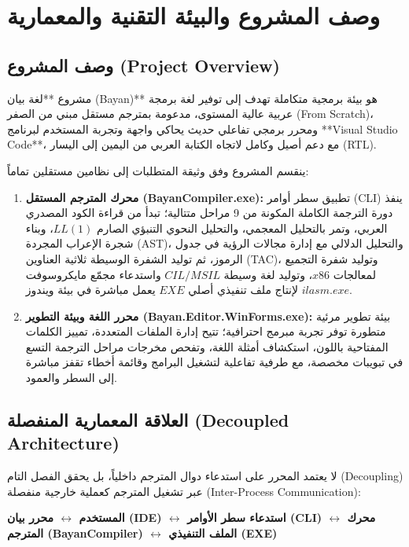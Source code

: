 \documentclass[12pt,a4paper]{report}
\begin{document}
\chapter{وصف المشروع والبيئة التقنية والمعمارية}

\section{وصف المشروع (Project Overview)}
مشروع **لغة بيان (Bayan)** هو بيئة برمجية متكاملة تهدف إلى توفير لغة برمجة عربية عالية المستوى، مدعومة بمترجم مستقل مبني من الصفر (From Scratch)، ومحرر برمجي تفاعلي حديث يحاكي واجهة وتجربة المستخدم لبرنامج **Visual Studio Code**، مع دعم أصيل وكامل لاتجاه الكتابة العربي من اليمين إلى اليسار (RTL).

ينقسم المشروع وفق وثيقة المتطلبات إلى نظامين مستقلين تماماً:
\begin{enumerate}
    \item \textbf{محرك المترجم المستقل (BayanCompiler.exe):} تطبيق سطر أوامر (CLI) ينفذ دورة الترجمة الكاملة المكونة من 9 مراحل متتالية؛ تبدأ من قراءة الكود المصدري العربي، وتمر بالتحليل المعجمي، والتحليل النحوي التنبؤي الصارم $LL(1)$، وبناء شجرة الإعراب المجردة (AST)، والتحليل الدلالي مع إدارة مجالات الرؤية في جدول الرموز، ثم توليد الشفرة الوسيطة ثلاثية العناوين (TAC)، وتوليد شفرة التجميع لمعالجات $x86$، وتوليد لغة وسيطة $CIL/MSIL$ واستدعاء مجمّع مايكروسوفت $ilasm.exe$ لإنتاج ملف تنفيذي أصلي $EXE$ يعمل مباشرة في بيئة ويندوز.
    \item \textbf{محرر اللغة وبيئة التطوير (Bayan.Editor.WinForms.exe):} بيئة تطوير مرئية متطورة توفر تجربة مبرمج احترافية؛ تتيح إدارة الملفات المتعددة، تمييز الكلمات المفتاحية باللون، استكشاف أمثلة اللغة، وتفحص مخرجات مراحل الترجمة التسع في تبويبات مخصصة، مع طرفية تفاعلية لتشغيل البرامج وقائمة أخطاء تقفز مباشرة إلى السطر والعمود.
\end{enumerate}

\section{العلاقة المعمارية المنفصلة (Decoupled Architecture)}
لا يعتمد المحرر على استدعاء دوال المترجم داخلياً، بل يحقق الفصل التام (Decoupling) عبر تشغيل المترجم كعملية خارجية منفصلة (Inter-Process Communication):
\begin{center}
    \textbf{المستخدم $\longleftrightarrow$ محرر بيان (IDE) $\longleftrightarrow$ استدعاء سطر الأوامر (CLI) $\longleftrightarrow$ محرك المترجم (BayanCompiler) $\longleftrightarrow$ الملف التنفيذي (EXE)}
\end{center}
\end{document}
